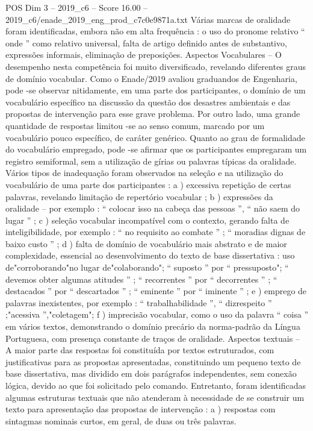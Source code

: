 \begin{textsample}{POS Dim 3 – 2019\_c6 – Score 16.00 – 2019\_c6/enade\_2019\_eng\_prod\_c7c0e9871a.txt}
Várias marcas de oralidade foram identificadas, embora não em alta frequência : o uso do pronome relativo “ onde ” como relativo universal, falta de artigo definido antes de substantivo, expressões informais, eliminação de preposições.
Aspectos Vocabulares – O desempenho nesta competência foi muito diversificado, revelando diferentes graus de domínio vocabular.
Como o Enade/2019 avaliou graduandos de Engenharia, pode -se observar nitidamente, em uma parte dos participantes, o domínio de um vocabulário específico na discussão da questão dos desastres ambientais e das propostas de intervenção para esse grave problema.
Por outro lado, uma grande quantidade de respostas limitou -se ao senso comum, marcado por um vocabulário pouco específico, de caráter genérico.
Quanto ao grau de formalidade do vocabulário empregado, pode -se afirmar que os participantes empregaram um registro semiformal, sem a utilização de gírias ou palavras típicas da oralidade.
Vários tipos de inadequação foram observados na seleção e na utilização do vocabulário de uma parte dos participantes : a ) excessiva repetição de certas palavras, revelando limitação de repertório vocabular ; b ) expressões da oralidade – por exemplo : “ colocar isso na cabeça das pessoas ”, “ não saem do lugar ” ; c ) seleção vocabular incompatível com o contexto, gerando falta de inteligibilidade, por exemplo : “ no requisito ao combate ” ; “ moradias dignas de baixo custo ” ; d ) falta de domínio de vocabulário mais abstrato e de maior complexidade, essencial ao desenvolvimento do texto de base dissertativa : uso de"corroborando"no lugar de"colaborando"; “ suposto ” por “ pressuposto"; “ devemos obter algumas atitudes ” ; “ recorrentes ” por “ decorrentes ” ; “ destacados ” por “ descartados ” ; “ eminente ” por “ iminente ” ; e ) emprego de palavras inexistentes, por exemplo : “ trabalhabilidade ”, “ dizrespeito ” ;"acessiva ”,"coletagem"; f ) imprecisão vocabular, como o uso da palavra “ coisa ” em vários textos, demonstrando o domínio precário da norma-padrão da Língua Portuguesa, com presença constante de traços de oralidade.
Aspectos textuais – A maior parte das respostas foi constituída por textos estruturados, com justificativas para as propostas apresentadas, constituindo um pequeno texto de base dissertativa, mas dividido em dois parágrafos independentes, sem conexão lógica, devido ao que foi solicitado pelo comando.
Entretanto, foram identificadas algumas estruturas textuais que não atenderam à necessidade de se construir um texto para apresentação das propostas de intervenção : a ) respostas com sintagmas nominais curtos, em geral, de duas ou três palavras.

\end{textsample}
